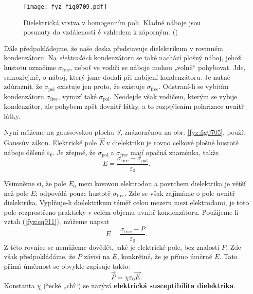     \begin{figure}[ht!] %
      \centering
      \texttt{[image: fyz\_fig0709.pdf]}
      \caption{Dielektrická vrstva v homogenním poli. Kladné náboje jsou posunuty do vzdálenosti
              \(δ\) vzhledem k záporným. (\cite[s.~177]{Feynman02})}
      \label{fyz:fig0709}
    \end{figure}
    
    Dále předpokládejme, že naše deska představuje dielektrikum v rovinném kondenzátoru. Na
    \emph{elektrodách} kondenzátoru se také nachází plošný náboj, jehož hustotu označíme
    \(σ_{\text{free}}\), neboť ve vodiči se náboje mohou „volně“ pohybovat. Jde, samozřejmě, o
    náboj, který jsme dodali při nabíjení kondenzátoru. Je nutné zdůraznit, že \(σ_{\text{pol}}\)
    existuje jen proto, že existuje \(σ_{\text{free}}\). Odstraní-li se vybitím kondenzátoru
    \(σ_{\text{free}}\), vymizí také \(σ_{\text{pol}}\). Neodejde však vodičem, kterým se vybije
    kondenzátor, ale pohybem zpět dovnitř látky, a to rozptýlením polarizace uvnitř látky.

    Nyní můžeme na gaussovskou plochu \(S\), znázorněnou na obr. \ref{fyz:fig0705}, použít Gaussův
    zákon. Elektrické pole \(\vec{E}\) v dielektriku je rovno celkové plošné hustotě náboje dělené
    \(\varepsilon_0\). Je zřejmé, že \(σ_{\text{pol}}\) a \(σ_{\text{free}}\) mají opačná znaménka,
    takže
    \begin{equation}\label{fyz:eq912}
      E = \dfrac{σ_{\text{free}} - σ_{\text{pol}}}{\varepsilon_0}.
    \end{equation}

    Všimněme si, že pole \(E_0\) mezi kovovou elektrodou a povrchem dielektrika je větší než pole
    \(E\); odpovídá pouze hustotě \(σ_{\text{free}}\). Zde se však zajímáme o pole uvnitř
    dielektrika. Vyplňuje-li dielektrikum téměř celou mezeru mezi elektrodami, je toto pole
    rozprostřeno prakticky v celém objemu uvnitř kondenzátoru. Použijeme-li vztah (\ref{fyz:eq911}),
    můžeme napsat
    \begin{equation}\label{fyz:eq913}
      E = \dfrac{σ_{\text{free}} - P}{\varepsilon_0}.
    \end{equation}
    Z této rovnice se nemůžeme dovědět, jaké je elektrické pole, bez znalosti \(P\). Zde však
    předpokládáme, že \(P\) závisí na \(E\), konkrétně, že je přímo úměrné \(E\). Tato přímá
    úměrnost se obvykle zapisuje takto:
    \begin{equation}\label{fyz:eq914}
      \vec{P}=χ\varepsilon_0\vec{E}.
    \end{equation}
    Konstanta \(χ\) (řecké „chí“) se nazývá \textbf{elektrická susceptibilita dielektrika}.

